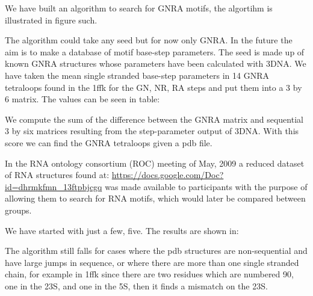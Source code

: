\documentclass[10pt, oneside, pdftex]{article}
\begin{document}
We have built an algorithm to search for GNRA motifs, the algortihm is
illustrated in figure such.

The algorithm could take any seed but for now only GNRA. In the future
the aim is to make a database of motif base-step parameters.
The seed  is made  up of known  GNRA structures whose  parameters have
been calculated with 3DNA.
We have taken the mean single stranded base-step parameters in 14 GNRA
tetraloops found  in the 1ffk  for the GN,  NR, RA steps and  put them
into a 3 by 6 matrix. The values can be seen in table:

We  compute the  sum of  the difference  between the  GNRA  matrix and
sequential 3 by six  matrices resulting from the step-parameter output
of 3DNA. With  this score we can find the GNRA  tetraloops given a pdb
file.

In the  RNA ontology consortium (ROC)  meeting of May,  2009 a reduced
dataset        of        RNA        structures        found        at:
\url{https://docs.google.com/Doc?id=dhrmkfmn_13ftpbjcgq}    was   made
available to participants with the  purpose of allowing them to search
for RNA motifs, which would later be compared between groups.

We have started with just a few, five. The results are shown in:

The  algorithm still  falls for  cases  where the  pdb structures  are
non-sequential and  have large jumps  in sequence, or where  there are
more than one  single stranded chain, for example  in 1ffk since there
are two residues which are numbered 90, one in the 23S, and one in the
5S, then it finds a mismatch on the 23S.



\end{document}
